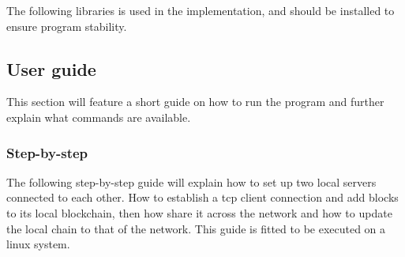 \documentclass[paper=a4, fontsize=11pt]{scrartcl} %
\numberwithin{equation}{section} %
\numberwithin{figure}{section} %
\numberwithin{table}{section} %
\begin{document}
The following libraries is used in the implementation, and should be installed to ensure program stability.



\subsection{User guide}

This section will feature a short guide on how to run the program and further explain what commands are available. 

\subsubsection{Step-by-step}

The following step-by-step guide will explain how to set up two local servers connected to each other. How to establish a tcp client connection and add blocks to its local blockchain, then how share it across the network and how to update the local chain to that of the network. This guide is  fitted to be executed on a linux system.
\end{document}
